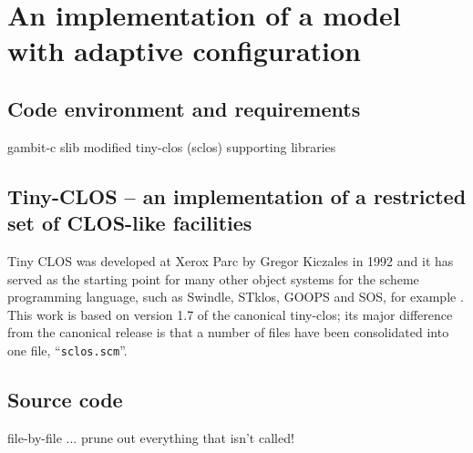 

\chapter[A MODEL WITH ADAPTIVE CONFIGURATION]{An implementation of a
  model with adaptive configuration}

\newpage



\section{Code environment and requirements}
gambit-c
slib
modified tiny-clos (sclos)
supporting libraries




    
    



\section{Tiny-CLOS -- an implementation of a restricted set of
  CLOS-like facilities}

Tiny CLOS was developed at Xerox Parc by Gregor Kiczales in 1992
\citep{TinyCLOS} and it has served as the starting point for many
other object systems for the scheme programming language, such as
Swindle, STklos, GOOPS and SOS, for example
\citep{Swindle,STklos,GNU-GOOPS,GNU-SOS}. This work is based on
version 1.7 of the canonical tiny-clos; its major difference from the
canonical release is that a number of files have been consolidated
into one file, ``\texttt{sclos.scm}''. 

\section{Source code}
file-by-file ... prune out everything that isn't called!

